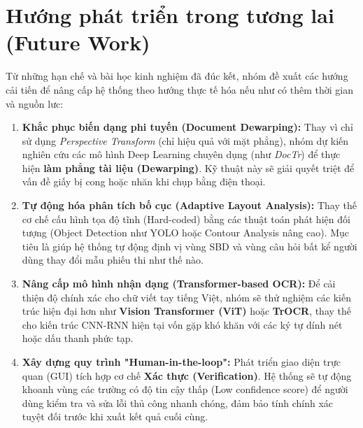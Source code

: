 \documentclass[6pt, a4paper]{report}
\begin{document}
	\section{Hướng phát triển trong tương lai (Future Work)}
	
	Từ những hạn chế và bài học kinh nghiệm đã đúc kết, nhóm đề xuất các hướng cải tiến để nâng cấp hệ thống theo hướng thực tế hóa nếu như có thêm thời gian và nguồn lưc:
	
	\begin{enumerate}
		\item \textbf{Khắc phục biến dạng phi tuyến (Document Dewarping):} 
		Thay vì chỉ sử dụng \textit{Perspective Transform} (chỉ hiệu quả với mặt phẳng), nhóm dự kiến nghiên cứu các mô hình Deep Learning chuyên dụng (như \textit{DocTr}) để thực hiện \textbf{làm phẳng tài liệu (Dewarping)}. Kỹ thuật này sẽ giải quyết triệt để vấn đề giấy bị cong hoặc nhăn khi chụp bằng điện thoại.
		
		\item \textbf{Tự động hóa phân tích bố cục (Adaptive Layout Analysis):} 
		Thay thế cơ chế cấu hình tọa độ tĩnh (Hard-coded) bằng các thuật toán phát hiện đối tượng (Object Detection như YOLO hoặc Contour Analysis nâng cao). Mục tiêu là giúp hệ thống tự động định vị vùng SBD và vùng câu hỏi bất kể người dùng thay đổi mẫu phiếu thi như thế nào.
		
		\item \textbf{Nâng cấp mô hình nhận dạng (Transformer-based OCR):} 
		Để cải thiện độ chính xác cho chữ viết tay tiếng Việt, nhóm sẽ thử nghiệm các kiến trúc hiện đại hơn như \textbf{Vision Transformer (ViT)} hoặc \textbf{TrOCR}, thay thế cho kiến trúc CNN-RNN hiện tại vốn gặp khó khăn với các ký tự dính nét hoặc dấu thanh phức tạp.
		
		\item \textbf{Xây dựng quy trình "Human-in-the-loop":} 
		Phát triển giao diện trực quan (GUI) tích hợp cơ chế \textbf{Xác thực (Verification)}. Hệ thống sẽ tự động khoanh vùng các trường có độ tin cậy thấp (Low confidence score) để người dùng kiểm tra và sửa lỗi thủ công nhanh chóng, đảm bảo tính chính xác tuyệt đối trước khi xuất kết quả cuối cùng.
	\end{enumerate}
	
	\newpage
	
\end{document}

